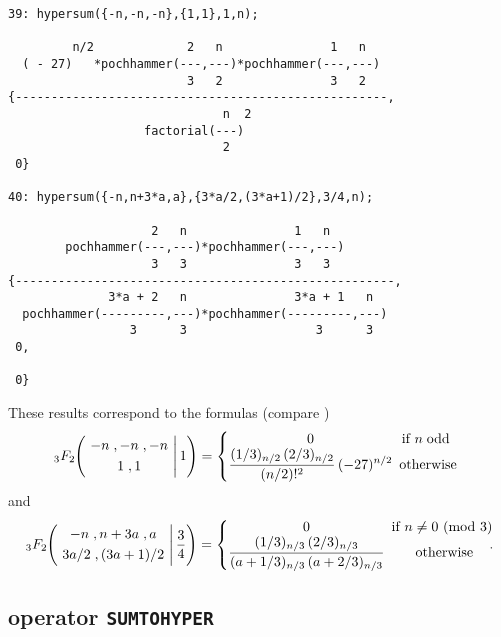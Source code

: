 {\small
\begin{verbatim}
39: hypersum({-n,-n,-n},{1,1},1,n);

         n/2             2   n               1   n
  ( - 27)   *pochhammer(---,---)*pochhammer(---,---)
                         3   2               3   2
{----------------------------------------------------,
                              n  2
                   factorial(---)
                              2
 0}

40: hypersum({-n,n+3*a,a},{3*a/2,(3*a+1)/2},3/4,n);

                    2   n               1   n
        pochhammer(---,---)*pochhammer(---,---)
                    3   3               3   3
{-----------------------------------------------------,
              3*a + 2   n               3*a + 1   n
  pochhammer(---------,---)*pochhammer(---------,---)
                 3      3                  3      3
 0,

 0}
\end{verbatim}
}\noindent
These results correspond to the formulas (compare \cite{Koepf})
\[
_3 F_2\left.
\!\!
\left(
\!\!\!\!
\begin{array}{c}
\multicolumn{1}{c}{\begin{array}{c}
-n\;, -n\;, -n
\end{array}}\\[1mm]
\multicolumn{1}{c}{\begin{array}{c}
1 \;, 1
            \end{array}}\end{array}
\!\!\!\!
\right| 1\right)
=
\funkdef{0}{n\;\mbox{odd}}{\displaystyle
\frac{(1/3)_{n/2}\,(2/3)_{n/2}}{(n/2)!^2}\,(-27)^{n/2}
}
\]
and
\[
_3 F_2\left.
\!\!
\left(
\!\!\!\!
\begin{array}{c}
\multicolumn{1}{c}{\begin{array}{c}
-n\;, n+3a\;, a
\end{array}}\\[1mm]
\multicolumn{1}{c}{\begin{array}{c}
3a/2\;,(3a+1)/2
            \end{array}}\end{array}
\!\!\!\!
\right| \frac{3}{4}\right)
=
\funkdef{0}{n\neq 0 {\mbox{ (mod }} 3)}{\displaystyle
\frac{(1/3)_{n/3}\,(2/3)_{n/3}}
{(a+1/3)_{n/3}\,(a+2/3)_{n/3}}
}
\!\!\!\!\!\!\!\!.
\]

\subsection{\REDUCE{} operator {\tt SUMTOHYPER}}

